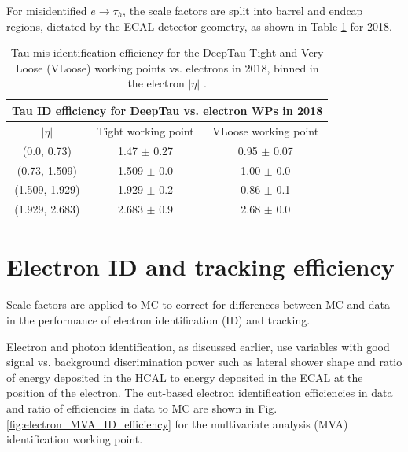 For misidentified $e \rightarrow \tau_{h}$, the scale factors are split into barrel and endcap regions, dictated by the ECAL detector geometry, as shown in Table \ref{table:tauIDeff_deepTau_vs_electron} for 2018.

\begin{table}[h]
    \centering
    \begin{tabular}{|c|c|c|}
    \hline
    \multicolumn{3}{|c|}{Tau ID efficiency for DeepTau vs. electron WPs in 2018} \\ \hline
    \hline
    $|\eta|$  & Tight working point & VLoose working point \\ \hline
    (0.0, 0.73)     & 1.47 $\pm$ 0.27  & 0.95 $\pm$ 0.07  \\ \hline 
    (0.73, 1.509)   & 1.509 $\pm$ 0.0  & 1.00 $\pm$ 0.0  \\ \hline 
    (1.509, 1.929)  & 1.929 $\pm$ 0.2  & 0.86 $\pm$ 0.1 \\ \hline 
    (1.929, 2.683)  & 2.683 $\pm$ 0.9  & 2.68 $\pm$ 0.0 \\ \hline
    \end{tabular}
    \caption[Tau mis-identification efficiency for the DeepTau Tight and Very Loose (VLoose) working points vs. electrons in 2018.]{Tau mis-identification efficiency for the DeepTau Tight and Very Loose (VLoose) working points vs. electrons in 2018, binned in the electron $|\eta|$ \cite{twiki_TAU_POG_tauidrecommendationforrun2}.}
    \label{table:tauIDeff_deepTau_vs_electron}
\end{table}


\section{Electron ID and tracking efficiency}
Scale factors are applied to MC to correct for differences between MC and data in the performance of electron identification (ID) and tracking.

Electron and photon identification, as discussed earlier, use variables with good signal vs. background discrimination power such as lateral shower shape and ratio of energy deposited in the HCAL to energy deposited in the ECAL at the position of the electron. The cut-based electron identification efficiencies in data and ratio of efficiencies in data to MC are shown in Fig. \ref{fig:electron_MVA_ID_efficiency} for the multivariate analysis (MVA) identification working point. 


